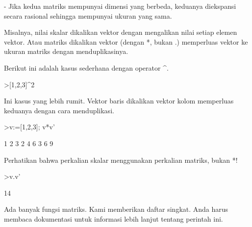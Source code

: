 \documentclass[a4paper,10pt]{article}
\begin{document}
\begin{eulernotebook}
\begin{eulercomment}
\begin{eulercomment}
\begin{eulercomment}
\begin{eulercomment}
\begin{eulercomment}
\begin{eulercomment}
\begin{eulercomment}
- Jika kedua matriks mempunyai dimensi yang berbeda, keduanya
diekspansi secara rasional sehingga mempunyai ukuran yang sama.

Misalnya, nilai skalar dikalikan vektor dengan mengalikan nilai setiap
elemen vektor. Atau matriks dikalikan vektor (dengan *, bukan .)
memperluas vektor ke ukuran matriks dengan menduplikasinya.

Berikut ini adalah kasus sederhana dengan operator \textasciicircum{}.
\end{eulercomment}
\begin{eulerprompt}
>[1,2,3]^2
\end{eulerprompt}
\begin{euleroutput}
  [1,  4,  9]
\end{euleroutput}
\begin{eulercomment}
Ini kasus yang lebih rumit. Vektor baris dikalikan vektor kolom
memperluas keduanya dengan cara menduplikasi.
\end{eulercomment}
\begin{eulerprompt}
>v:=[1,2,3]; v*v'
\end{eulerprompt}
\begin{euleroutput}
              1             2             3 
              2             4             6 
              3             6             9 
\end{euleroutput}
\begin{eulercomment}
Perhatikan bahwa perkalian skalar menggunakan perkalian matriks, bukan
*!
\end{eulercomment}
\begin{eulerprompt}
>v.v'
\end{eulerprompt}
\begin{euleroutput}
  14
\end{euleroutput}
\begin{eulercomment}
Ada banyak fungsi matriks. Kami memberikan daftar singkat. Anda harus
membaca dokumentasi untuk informasi lebih lanjut tentang perintah ini.


\end{eulercomment}
\end{eulercomment}
\end{eulercomment}
\end{eulercomment}
\end{eulercomment}
\end{eulercomment}
\end{eulercomment}
\end{eulernotebook}
\end{document}
